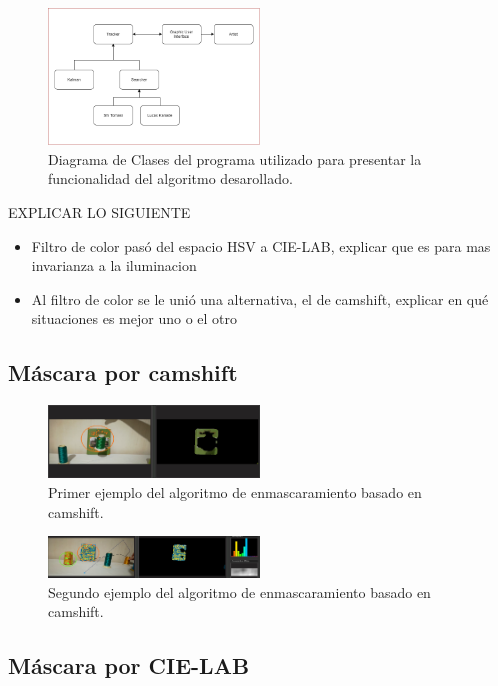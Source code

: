 \begin{figure}
	\centering
	\includegraphics[width=0.5\textwidth]{Imagenes/classd.png}
	\caption{Diagrama de Clases del programa utilizado para presentar la funcionalidad del algoritmo desarollado.}
	\label{fig:class}
\end{figure}
EXPLICAR LO SIGUIENTE
\begin{itemize}
\item Filtro de color pasó del espacio HSV a CIE-LAB, explicar que es para mas invarianza a la iluminacion
\item Al filtro de color se le unió una alternativa, el de camshift, explicar en qué situaciones es mejor uno o el otro
\end{itemize}
\subsection{Máscara por camshift}
\begin{figure}
\centering
	\includegraphics[width=0.5\textwidth]{Imagenes/camshift_mask1.png}
	\caption{Primer ejemplo del algoritmo de enmascaramiento basado en camshift.}
	\label{fig:c_mask1}
\end{figure}
\begin{figure}
\centering
	\includegraphics[width=0.5\textwidth]{Imagenes/camshift_mask2.png}
	\caption{Segundo ejemplo del algoritmo de enmascaramiento basado en camshift.}
	\label{fig:c_mask2}
\end{figure}
\subsection{Máscara por CIE-LAB}



